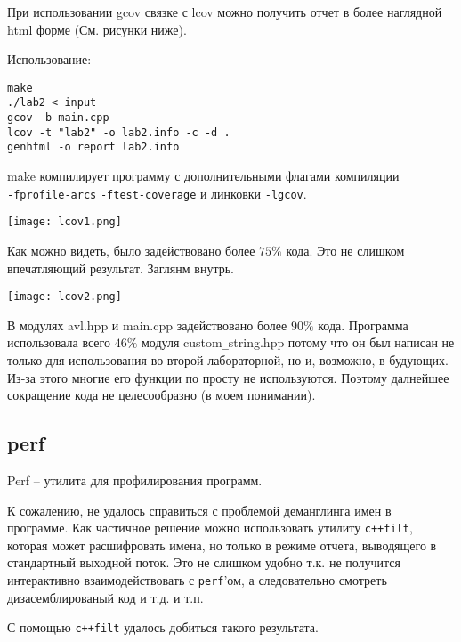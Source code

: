 \documentclass[12pt]{article}
\begin{document}
При использовании gcov связке с lcov можно получить отчет в более наглядной html форме (См. рисунки ниже).

Использование:
\begin{lstlisting}
make
./lab2 < input
gcov -b main.cpp
lcov -t "lab2" -o lab2.info -c -d .  
genhtml -o report lab2.info
\end{lstlisting}

make компилирует программу с дополнительными флагами компиляции \\\verb|-fprofile-arcs| \verb|-ftest-coverage| и линковки \verb|-lgcov|.

\begin{center}
    \texttt{[image: lcov1.png]}
\end{center}

Как можно видеть, было задействовано более  $75\%$ кода. Это не слишком впечатляющий результат.
Заглянм внутрь.

\begin{center}
    \texttt{[image: lcov2.png]}
\end{center}

В модулях avl.hpp и main.cpp задействовано более $90\%$ кода. Программа использовала всего $46\%$ модуля custom\verb|_|string.hpp потому что он был написан не только для использования во второй лабораторной, но и, возможно, в будующих. Из-за этого многие его функции по просту не используются. Поэтому далнейшее сокращение кода не целесообразно (в моем понимании).

\subsection*{perf}

Perf -- утилита для профилирования программ.

К сожалению, не удалось справиться с проблемой деманглинга имен в программе. Как частичное решение можно использовать утилиту \verb|c++filt|, которая может расшифровать имена, но только в режиме отчета, выводящего в стандартный выходной поток. Это не слишком удобно т.к. не получится интерактивно взаимодействовать с \verb|perf|'ом, а следовательно смотреть дизасемблированый код и т.д. и т.п.

С помощью  \verb|c++filt| удалось добиться такого результата.
\end{document}
